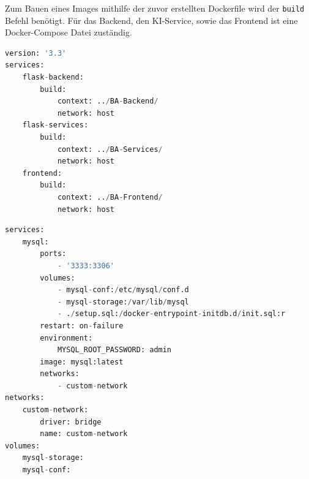Zum Bauen eines Images mithilfe der zuvor erstellten Dockerfile wird der \texttt{build} Befehl benötigt. Für das Backend, den KI-Service, sowie das Frontend ist eine Docker-Compose Datei zuständig.


\begin{lstlisting}[language=Python]
version: '3.3'
services: 
    flask-backend:
        build: 
            context: ../BA-Backend/
            network: host
    flask-services:
        build:
            context: ../BA-Services/
            network: host
    frontend:
        build:
            context: ../BA-Frontend/
            network: host
\end{lstlisting}

\begin{lstlisting}[language=Python]
services:
    mysql: 
        ports: 
            - '3333:3306'
        volumes: 
            - mysql-conf:/etc/mysql/conf.d
            - mysql-storage:/var/lib/mysql
            - ./setup.sql:/docker-entrypoint-initdb.d/init.sql:r
        restart: on-failure
        environment: 
            MYSQL_ROOT_PASSWORD: admin
        image: mysql:latest
        networks:
            - custom-network
networks: 
    custom-network:
        driver: bridge
        name: custom-network
volumes:
    mysql-storage:
    mysql-conf:
\end{lstlisting}